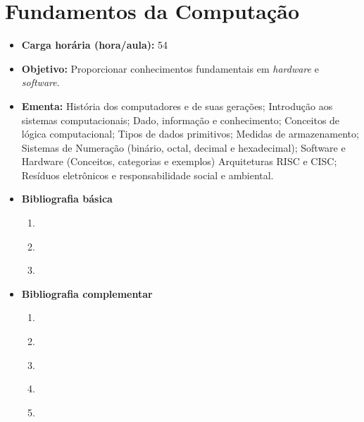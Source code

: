\documentclass[
	10pt,				%
	openright,			%
	twoside,			%
	a4paper,			%
	english,			%
	french,				%
	brazil,				%
	sumario=tradicional
]{abntex2}
\begin{document}
\newpage
\section*{Fundamentos da Computação}\label{1_fundcomp}
\begin{itemize}
	\item \textbf{Carga horária (hora/aula):} 54
	\item \textbf{Objetivo:} Proporcionar conhecimentos fundamentais em \textit{hardware} e \textit{software}.
	\item \textbf{Ementa:} 
	História dos computadores e de suas gerações; 
	Introdução aos sistemas computacionais;
	Dado, informação e conhecimento;
	Conceitos de lógica computacional; 
	Tipos de dados primitivos;
	Medidas de armazenamento; 
	Sistemas de Numeração (binário, octal, decimal e hexadecimal);
	Software e Hardware (Conceitos, categorias e exemplos) 
	Arquiteturas RISC e CISC; 
	Resíduos eletrônicos e responsabilidade social e ambiental.
	\item \textbf{Bibliografia básica}
	\begin{enumerate}
		\item \cite{souza2008}
		\item \cite{stallings2010}
		\item \cite{tanenbaumaustin2013}
	\end{enumerate}
	\item \textbf{Bibliografia complementar}
	\begin{enumerate}
		\item \cite{weber2012}
		\item \cite{monteiro2007}
		\item \cite{torres2015}
		\item \cite{morimoto2010}
		\item \cite{brookshearleeoliveira} 
	\end{enumerate}	
\end{itemize}

\newpage
\end{document}
